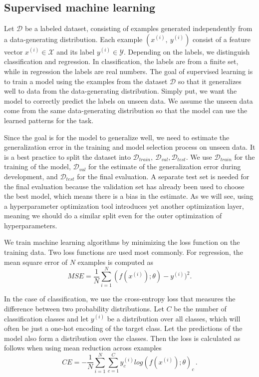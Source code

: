 \subsection{Supervised machine learning}
Let $\mathcal{D}$ be a labeled dataset, consisting of examples generated independently from a data-generating distribution. Each example $(x^{(i)}, \  y^{(i)})$ consist of a feature vector $x^{(i)}\in \mathcal{X}$ and its label $y^{(i)}\in \mathcal{Y}$. Depending on the labels, we distinguish classification and regression. In classification, the labels are from a finite set, while in regression the labels are real numbers. The goal of supervised learning is to train a model using the examples from the dataset $\mathcal{D}$ so that it generalizes well to data from the data-generating distribution. Simply put, we want the model to correctly predict the labels on unseen data. We assume the unseen data come from the same data-generating distribution so that the model can use the learned patterns for the task.  %

Since the goal is for the model to generalize well, we need to estimate the generalization error in the training and model selection process on unseen data. It is a best practice to split the dataset into $\mathcal{D}_{train}, \  \mathcal{D}_{val}, \mathcal{D}_{test}$. We use $\mathcal{D}_{train}$ for the training of the model, $\mathcal{D}_{val}$ for the estimate of the generalization error during development, and $\mathcal{D}_{test}$ for the final evaluation. A separate test set is needed for the final evaluation because the validation set has already been used to choose the best model, which means there is a bias in the estimate. As we will see, using a hyperparameter optimization tool introduces yet another optimization layer, meaning we should do a similar split even for the outer optimization of hyperparameters.


We train machine learning algorithms by minimizing the loss function on the training data. Two loss functions are used most commonly. For regression, the mean square error of $N$ examples is computed as $$ MSE=\frac{1}{N} \sum_{i=1}^{N} (f(x^{(i)});\theta )-y^{(i)})^2.$$

In the case of classification, we use the cross-entropy loss that measures the difference between two probability distributions. Let $C$ be the number of classification classes and let $y^{(i)}$ be a distribution over all classes, which will often be just a one-hot encoding of the target class. Let the predictions of the model also form a distribution over the classes. Then the loss is calculated as follows when using mean reduction across examples $$CE=-\frac{1}{N} \sum_{i=1}^{N} \sum_{c=1}^{C} y^{(i)}_c log(f(x^{(i)});\theta )_c\, .$$

